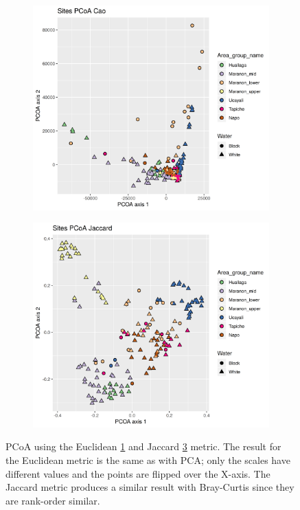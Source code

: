 \begin{figure}[h]
\centering
\begin{subfigure}{0.4\textwidth}
\includegraphics[width = \textwidth]{pcoa12eucotu}
\caption{}
\label{fig:pcoaeuc}
\end{subfigure}
\begin{subfigure}{ 0.4\textwidth}
\includegraphics[width = \textwidth]{pcoa12jacotu}
\caption{}
\label{fig:pcoajac}
\end{subfigure}
\caption{PCoA using the Euclidean \ref{fig:pcoaeuc}  and Jaccard \ref{fig:pcoajac} metric. The result for the Euclidean metric is the same as with PCA; only the scales have different values and the points are flipped over the X-axis. The Jaccard metric produces a similar result with Bray-Curtis since they are rank-order similar.}
\end{figure}

